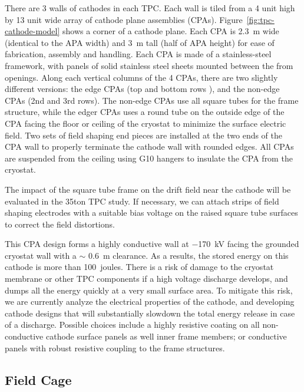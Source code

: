 There are 3 walls of cathodes in each TPC.  Each wall is tiled from a 4 unit high by 13 unit wide array of cathode plane assemblies (CPAs). Figure~\ref{fig:tpc-cathode-model} shows a corner of a cathode plane.  Each CPA is 2.3~m wide (identical to the APA width) and 3~m tall (half of APA height) for ease of fabrication, assembly and handling.  Each CPA is made of a stainless-steel framework, 
with panels of solid stainless steel sheets mounted between the from openings.  Along each vertical  columns of the 4 CPAs, there are two slightly different versions: the edge CPAs (top and bottom rows ), and the non-edge CPAs (2nd and 3rd rows).  The non-edge CPAs use all square tubes for the frame structure, while the edger CPAs uses a round tube on the outside edge of the CPA facing the floor or ceiling of the cryostat to minimize the surface electric field.  Two sets of field shaping end pieces are installed at the two ends of the CPA wall to properly terminate the cathode wall with rounded edges.  All CPAs are suspended from the ceiling using G10 hangers to insulate the CPA from the cryostat.


The impact of the square tube frame on the drift field near the cathode will be evaluated in the 35ton TPC study.  If necessary, we can attach strips of field shaping electrodes with a suitable bias voltage on the raised square tube surfaces to correct the field distortions.  


This CPA design forms a highly conductive wall at $-$170~kV facing the grounded cryostat wall with a $\sim$ 0.6~m clearance.  As a results, the stored energy on this cathode is more than 100~joules.  There is a risk of damage to the cryostat membrane or other TPC components if a high voltage discharge develops, and dumps all the energy quickly at a very small surface area. To mitigate this risk, we are currently analyze the electrical properties of the cathode, and developing cathode designs that will substantially slowdown the total energy release in case of a discharge.  Possible choices include a highly resistive coating on all non-conductive cathode surface panels as well inner frame members; or conductive panels with robust resistive coupling to the frame structures.




\subsection{Field Cage}
\label{subsec:fd-ref-fieldcage}

